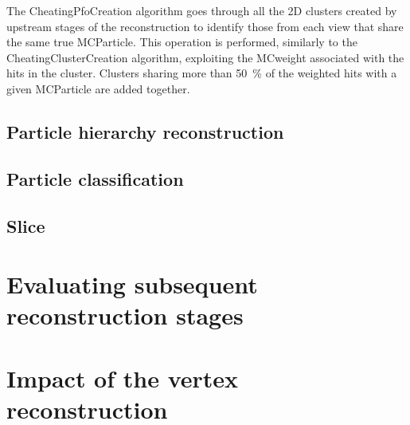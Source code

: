 The CheatingPfoCreation algorithm goes through all the 2D clusters created by upstream stages of the reconstruction to identify those from each view that share the same true MCParticle. This operation is performed, similarly to the CheatingClusterCreation algorithm, exploiting the MCweight associated with the hits in the cluster. Clusters sharing more than \SI{50}{\percent} of the weighted hits with a given MCParticle are added together. 


\subsection{Particle hierarchy reconstruction}



\subsection{Particle classification}


\subsection{Slice }



\section{Evaluating subsequent reconstruction stages}



\section{Impact of the vertex reconstruction}

